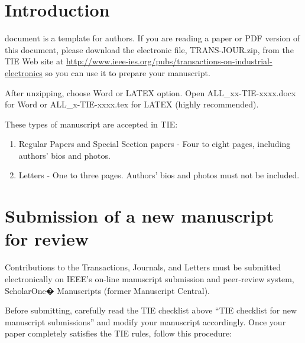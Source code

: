 \documentclass[journal]{IEEEtranTIE}
\begin{document}
%
{}


\section{Introduction}

 document is a template for authors. If you are reading a paper or PDF version of this document, please download the electronic file, TRANS-JOUR.zip, from the TIE Web site at \url{http://www.ieee-ies.org/pubs/transactions-on-industrial-electronics} so you can use it to prepare your manuscript.

After unzipping, choose Word or LATEX option. Open ALL\_xx-TIE-xxxx.docx for Word or ALL\_x-TIE-xxxx.tex for LATEX (highly recommended).

These types of manuscript are accepted in TIE:


\begin{enumerate}[1)]
	\item Regular Papers and Special Section papers - Four to eight pages, including authors' bios and photos.
	\item Letters - One to three pages. Authors' bios and photos must not be included.
\end{enumerate}


\section{Submission of a new manuscript for review}

Contributions to the Transactions, Journals, and Letters must be submitted electronically on IEEE's on-line manuscript submission and peer-review system, ScholarOne� Manuscripts (former Manuscript Central).

Before submitting, carefully read the TIE checklist above ``TIE checklist for new manuscript submissions'' and modify your manuscript accordingly. Once your paper completely satisfies the TIE rules, follow this procedure:
\end{document}
